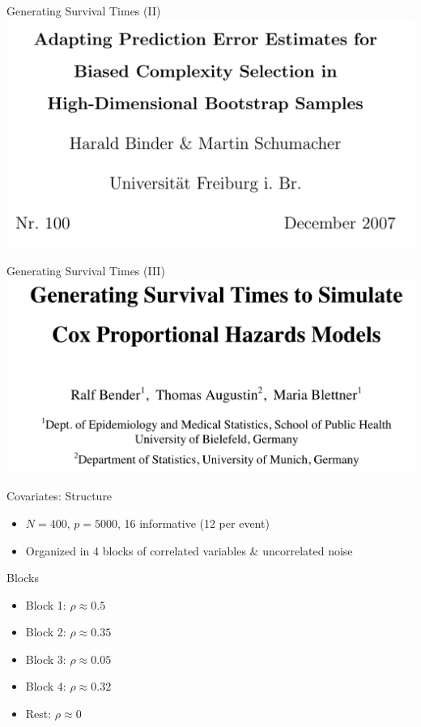 \documentclass{beamer}
\providecommand{\tightlist}{%
  \setlength{\itemsep}{0pt}\setlength{\parskip}{0pt}}
\begin{document}
\begin{frame}{Generating Survival Times (II)}
\protect\hypertarget{generating-survival-times-ii}{}
\includegraphics[width=0.95\linewidth]{img/binder2007}

\textcite{binder2008adaptingprediction}
\end{frame}

\begin{frame}{Generating Survival Times (III)}
\protect\hypertarget{generating-survival-times-iii}{}
\includegraphics[width=0.95\linewidth]{img/bender2003}

\textcite{bender2005generatingsurvival}
\end{frame}

\begin{frame}{Covariates: Structure}
\protect\hypertarget{covariates-structure}{}
\begin{itemize}
\tightlist
\item
  \(N = 400\), \(p = 5000\), 16 informative (12 per event)
\item
  Organized in 4 blocks of correlated variables \& uncorrelated noise
\end{itemize}

\begin{block}{Blocks}
\protect\hypertarget{blocks}{}
\begin{itemize}
\tightlist
\item
  Block 1: \(\rho \approx 0.5\)
\item
  Block 2: \(\rho \approx 0.35\)
\item
  Block 3: \(\rho \approx 0.05\)
\item
  Block 4: \(\rho \approx 0.32\)
\item
  Rest: \(\rho \approx 0\)
\end{itemize}
\end{block}
\end{frame}
\end{document}
